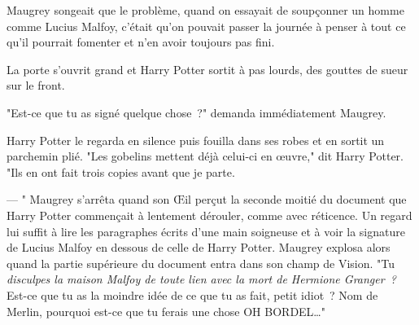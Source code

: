 Maugrey songeait que le problème, quand on essayait de soupçonner un homme comme Lucius Malfoy, c'était qu'on pouvait passer la journée à penser à tout ce qu'il pourrait fomenter et n'en avoir toujours pas fini.

La porte s'ouvrit grand et Harry Potter sortit à pas lourds, des gouttes de sueur sur le front.

"Est-ce que tu as signé quelque chose~?" demanda immédiatement Maugrey.

Harry Potter le regarda en silence puis fouilla dans ses robes et en sortit un parchemin plié. "Les gobelins mettent déjà celui-ci en œuvre," dit Harry Potter. "Ils en ont fait trois copies avant que je parte.

--- " Maugrey s'arrêta quand son Œil perçut la seconde moitié du document que Harry Potter commençait à lentement dérouler, comme avec réticence. Un regard lui suffit à lire les paragraphes écrits d'une main soigneuse et à voir la signature de Lucius Malfoy en dessous de celle de Harry Potter. Maugrey explosa alors quand la partie supérieure du document entra dans son champ de Vision. "Tu \emph{disculpes la maison Malfoy de toute lien avec la mort de Hermione Granger~?} Est-ce que tu as la moindre idée de ce que tu as fait, petit idiot~? Nom de Merlin, pourquoi est-ce que tu ferais une chose OH BORDEL…" 

